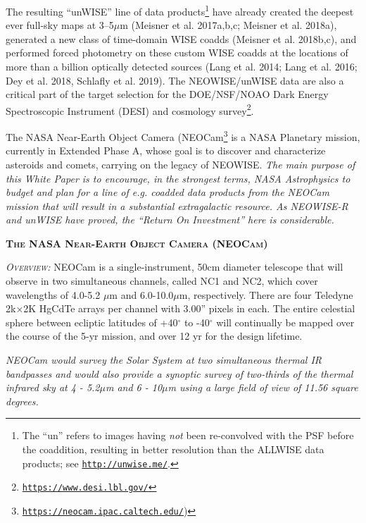 \documentclass[12pt]{article}
\begin{document}
\smallskip 
\smallskip
\noindent
The resulting ``unWISE'' line of data products\footnote{The ``un''
refers to images having {\it not} been re-convolved with the PSF
before the coaddition, resulting in better resolution than the ALLWISE
data products; see \href{http://unwise.me/}{{\tt http://unwise.me/}}.}
have already created the deepest ever full-sky maps at 3–5$\mu$m
(Meisner et al. 2017a,b,c; Meisner et al. 2018a), generated a new
class of time-domain WISE coadds (Meisner et al.  2018b,c), and
performed forced photometry on these custom WISE coadds at the
locations of more than a billion optically detected sources (Lang et
al. 2014; Lang et al. 2016; Dey et al. 2018, Schlafly et
al. 2019). The NEOWISE/unWISE data are also a critical part of the
target selection for the DOE/NSF/NOAO Dark Energy Spectroscopic
Instrument (DESI) and cosmology survey\footnote{\href{https://www.desi.lbl.gov/}{{\tt https://www.desi.lbl.gov/}}}.

\smallskip
\smallskip 
\noindent
The NASA Near-Earth Object Camera
(NEOCam\footnote{\href{https://neocam.ipac.caltech.edu/}{{\tt https://neocam.ipac.caltech.edu/}})}
is a NASA Planetary mission, currently in Extended Phase A, whose goal is to
discover and characterize asteroids and comets, carrying on the legacy
of NEOWISE. {\it The main purpose of this White Paper is to encourage,
in the strongest terms, NASA Astrophysics to budget and plan for a
line of e.g. coadded data products from the NEOCam mission that will
result in a substantial extragalactic resource. As NEOWISE-R and
unWISE have proved, the ``Return On Investment'' here is
considerable.}





\smallskip
\smallskip
\noindent
{\bfseries \textsc{\textcolor{Cerulean}{The NASA Near-Earth Object Camera (NEOCam)}}}

\smallskip
\noindent
\textsl{\textsc{Overview:}}
NEOCam is a single-instrument, 50cm diameter telescope that will observe in two
simultaneous channels, called NC1 and NC2, which cover wavelengths of
4.0-5.2 $\mu$m and 6.0-10.0$\mu$m, respectively. There are four Teledyne
2k$\times$2K HgCdTe arrays per channel with 3.00'' pixels in each. The entire
celestial sphere between ecliptic latitudes of +40$^{\circ}$ to -40$^{\circ}$ will
continually be mapped over the course of the 5-yr mission, and over 12
yr for the design lifetime. 

\smallskip
\smallskip
\noindent
{\it 
NEOCam would survey the Solar System at two simultaneous thermal IR
bandpasses and would also provide a synoptic survey of two-thirds of
the thermal infrared sky at 4 - 5.2$\mu$m and 6 - 10$\mu$m using a
large field of view of 11.56 square degrees.
}
\end{document}
